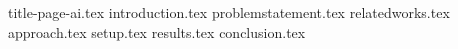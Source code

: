 \documentclass[a4paper,12pt]{article}
\begin{document}
{title-page-ai.tex}
\tableofcontents
\clearpage
\linenumbers
{introduction.tex}
{problemstatement.tex}
{relatedworks.tex}
{approach.tex}
{setup.tex}
{results.tex}
{conclusion.tex}

\printbibliography
\end{document}
